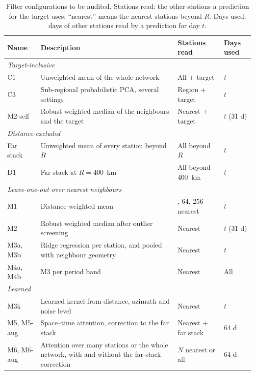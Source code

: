 \documentclass[preprint,12pt,authoryear]{elsarticle}
\begin{document}
\begin{table}[tbp]
  \centering
  \footnotesize
  \caption{Filter configurations to be audited. Stations read: the other stations a prediction for the target uses; ``nearest'' means the nearest stations beyond $R$. Days used: days of other stations read by a prediction for day $t$.}
  \label{tab:filters}
  \setlength{\tabcolsep}{4pt}
  \begin{tabular}{l >{\raggedright\arraybackslash}p{5.2cm} >{\raggedright\arraybackslash}p{2.6cm} l}
    \toprule
    Name & Description & Stations read & Days used \\
    \midrule
    \multicolumn{4}{l}{\textit{Target-inclusive}} \\
    C1 & Unweighted mean of the whole network & All + target & $t$ \\
    C3 & Sub-regional probabilistic PCA, several settings & Region + target & $t$ \\
    M2-self & Robust weighted median of the neighbours and the target & Nearest + target & $t$ (31 d) \\
    \multicolumn{4}{l}{\textit{Distance-excluded}} \\
    Far stack & Unweighted mean of every station beyond $R$ & All beyond $R$ & $t$ \\
    D1 & Far stack at $R = 400$~km & All beyond 400~km & $t$ \\
    \multicolumn{4}{l}{\textit{Leave-one-out over nearest neighbours}} \\
    M1 & Distance-weighted mean & 16, 64, 256 nearest & $t$ \\
    M2 & Robust weighted median after outlier screening & Nearest & $t$ (31 d) \\
    M3a, M3b & Ridge regression per station, and pooled with neighbour geometry & Nearest & $t$ \\
    M4a, M4b & M3 per period band & Nearest & All \\
    \multicolumn{4}{l}{\textit{Learned}} \\
    M3k & Learned kernel from distance, azimuth and noise level & Nearest & $t$ \\
    M5, M5-aug & Space--time attention, correction to the far stack & Nearest + far stack & 64 d \\
    M6, M6-aug & Attention over many stations or the whole network, with and without the far-stack correction & $N$ nearest or all & 64 d \\
    \bottomrule
  \end{tabular}
\end{table}
\end{document}
